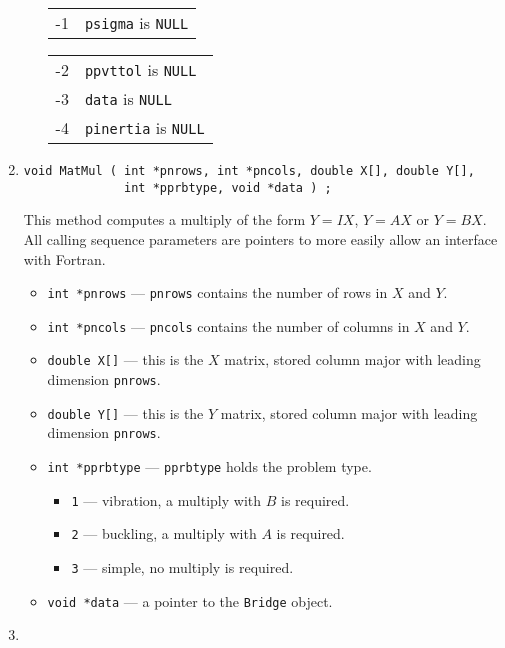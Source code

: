 \begin{enumerate}
\begin{itemize}
\begin{center}
\begin{tabular}[t]{rl}
      -1 & \texttt{psigma} is \texttt{NULL}
      \end{tabular}
      \begin{tabular}[t]{rl}
      -2 & \texttt{ppvttol} is \texttt{NULL} \\
      -3 & \texttt{data} is \texttt{NULL} \\
      -4 & \texttt{pinertia} is \texttt{NULL}
      \end{tabular}
      \end{center}
\end{itemize}
\item
\begin{verbatim}
void MatMul ( int *pnrows, int *pncols, double X[], double Y[],
              int *pprbtype, void *data ) ;
\end{verbatim}
This method computes a multiply of the form $Y = I X$, $Y = A X$
or $Y = B X$.
All calling sequence parameters are pointers to more
easily allow an interface with Fortran.
\begin{itemize}
\item {\tt int *pnrows} --- {\tt *pnrows} contains the number of
      rows in $X$ and $Y$.
\item {\tt int *pncols} --- {\tt *pncols} contains the number of
      columns in $X$ and $Y$.
\item {\tt double X[]} --- this is the $X$ matrix, stored column
      major with leading dimension {\tt *pnrows}.
\item {\tt double Y[]} --- this is the $Y$ matrix, stored column
      major with leading dimension {\tt *pnrows}.
\item {\tt int *pprbtype} --- {\tt *pprbtype} holds the problem type.
   \begin{itemize}
   \item {\tt 1} --- vibration, a multiply with $B$ is required.
   \item {\tt 2} --- buckling, a multiply with $A$ is required.
   \item {\tt 3} --- simple, no multiply is required.
   \end{itemize}
\item {\tt void *data} --- a pointer to the {\tt Bridge} object.
\end{itemize}
\item
\begin{verbatim}

\end{verbatim}
\end{enumerate}

